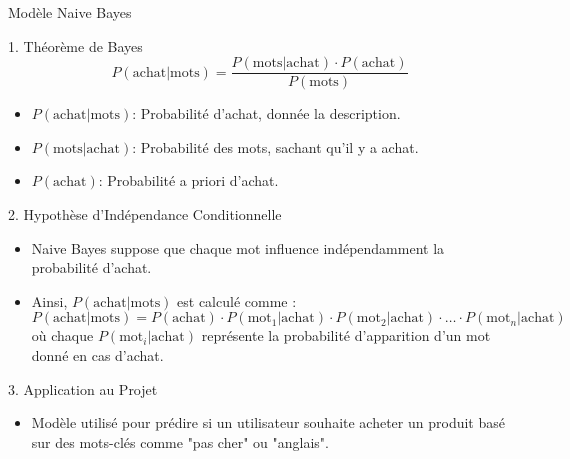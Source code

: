 \documentclass{beamer}
\begin{document}
\begin{frame}[allowframebreaks]{Modèle Naive Bayes}
    \begin{block}{1. Théorème de Bayes}
        \[
        P(\text{achat} | \text{mots}) = \frac{P(\text{mots} | \text{achat}) \cdot P(\text{achat})}{P(\text{mots})}
        \]
        \begin{itemize}
            \item \( P(\text{achat} | \text{mots}) \): Probabilité d'achat, donnée la description.
            \item \( P(\text{mots} | \text{achat}) \): Probabilité des mots, sachant qu'il y a achat.
            \item \( P(\text{achat}) \): Probabilité a priori d'achat.
        \end{itemize}
    \end{block}

    \begin{block}{2. Hypothèse d'Indépendance Conditionnelle}
        \begin{itemize}
            \item Naive Bayes suppose que chaque mot influence indépendamment la probabilité d'achat.
            \item Ainsi, \( P(\text{achat} | \text{mots}) \) est calculé comme :
            \[
            P(\text{achat} | \text{mots}) = P(\text{achat}) \cdot P(\text{mot}_1 | \text{achat}) \cdot P(\text{mot}_2 | \text{achat}) \cdot \dots \cdot P(\text{mot}_n | \text{achat})
            \]
            où chaque \( P(\text{mot}_i | \text{achat}) \) représente la probabilité d'apparition d'un mot donné en cas d'achat.
        \end{itemize}
    \end{block}

    \begin{block}{3. Application au Projet}
        \begin{itemize}
            \item Modèle utilisé pour prédire si un utilisateur souhaite acheter un produit basé sur des mots-clés comme "pas cher" ou "anglais".
        \end{itemize}
    \end{block}
\end{frame}
\end{document}
